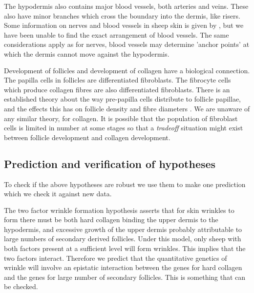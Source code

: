 \documentclass[]{interact}
\theoremstyle{plain}%
\theoremstyle{definition}
\theoremstyle{remark}
\begin{document}
The hypodermis also contains major blood vessels, both arteries and veins. These also have minor branches which cross the boundary into the dermis, like risers.   Some information on nerves and blood vessels in sheep skin is given by \citep{lyne-1968}, but we have been unable to find the exact arrangement of blood vessels. The same considerations apply as for nerves, blood vessels may determine 'anchor points' at which the dermis cannot move against the hypodermis.

Development of follicles and development of collagen have a biological connection. The papilla cells in follicles are differentiated fibroblasts. The fibrocyte cells which produce collagen fibres are also differentiated fibroblasts.  There is an established theory about the way pre-papilla cells distribute to follicle papillae, and the effects this has on follicle density and fibre diameters \citep{moore-1989,moore-1996}.  We are unaware of any similar theory, for collagen. It is possible that the population of fibroblast cells is limited in number at some stages so that a {\em tradeoff} situation might exist between follicle development and collagen development. 

\subsection{Prediction and verification of hypotheses}
To check if the above hypotheses are robust we use them to make one prediction which we check it against new data.

The two factor wrinkle formation hypothesis asserts that for skin wrinkles to form there must be both hard collagen binding the upper dermis to the hypodermis, and excessive growth of the upper dermis probably attributable to large numbers of secondary derived follicles. Under this model, only sheep with both factors present at a sufficient level will form wrinkles. This implies that the two factors interact. Therefore we predict that the quantitative genetics of wrinkle will involve an epistatic interaction between the genes for hard collagen and the genes for large number of secondary follicles. This is something that can be checked.
\end{document}
